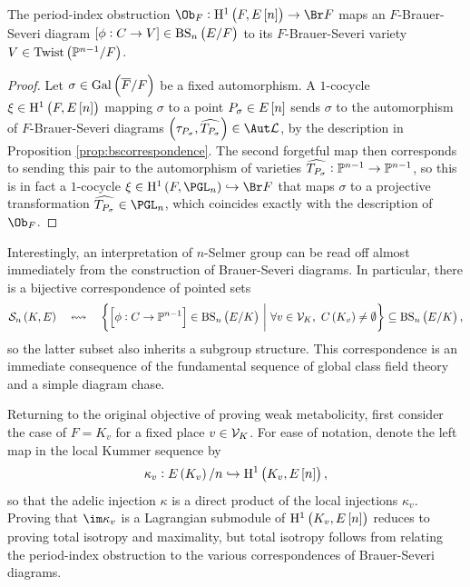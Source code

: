 \begin{proposition}
\label{prop:bsobstruction}
The period-index obstruction $ \Ob_F : \HE[n]{F} \to \Br F $ maps an $ F $-Brauer-Severi diagram $ \sbr{\phi : C \to V} \in \BS{F} $ to its $ F $-Brauer-Severi variety $ V \in \Twist{\PP^{n - 1}}{F} $.
\end{proposition}

\begin{proof}
Let $ \sigma \in \AG{F} $ be a fixed automorphism. A $ 1 $-cocycle $ \xi \in \HE[n]{F} $ mapping $ \sigma $ to a point $ P_\sigma \in E\sbr{n} $ sends $ \sigma $ to the automorphism of $ F $-Brauer-Severi diagrams $ \br{\tau_{P_\sigma}, \widehat{T_{P_\sigma}}} \in \Aut \LLL $, by the description in Proposition \ref{prop:bscorrespondence}. The second forgetful map then corresponds to sending this pair to the automorphism of varieties $ \widehat{T_{P_\sigma}} : \mathbb{P}^{n - 1} \to \mathbb{P}^{n - 1} $, so this is in fact a $ 1 $-cocycle $ \xi \in \H^1\br{F, \PGL_n} \hookrightarrow \Br F $ that maps $ \sigma $ to a projective transformation $ \widehat{T_{P_\sigma}} \in \PGL_n $, which coincides exactly with the description of $ \Ob_F $.
\end{proof}

\pagebreak

\begin{remark}
Interestingly, an interpretation of $ n $-Selmer group can be read off almost immediately from the construction of Brauer-Severi diagrams. In particular, there is a bijective correspondence of pointed sets
$$ \Sel[n] \quad \leftrightsquigarrow \quad \cbr{\sbr{\phi : C \to \PP^{n - 1}} \in \BS{K} \st \forall v \in \VVV_K, \ C\br{K_v} \ne \emptyset} \subseteq \BS{K}, $$
so the latter subset also inherits a subgroup structure. This correspondence is an immediate consequence of the fundamental sequence of global class field theory and a simple diagram chase.
\end{remark}

Returning to the original objective of proving weak metabolicity, first consider the case of $ F = K_v $ for a fixed place $ v \in \mathcal{V}_K $. For ease of notation, denote the left map in the local Kummer sequence by
$$ \kappa_v : \En{K_v} \hookrightarrow \HE[n]{K_v}, $$
so that the adelic injection $ \kappa $ is a direct product of the local injections $ \kappa_v $. Proving that $ \im \kappa_v $ is a Lagrangian submodule of $ \HE[n]{K_v} $ reduces to proving total isotropy and maximality, but total isotropy follows from relating the period-index obstruction to the various correspondences of Brauer-Severi diagrams.

